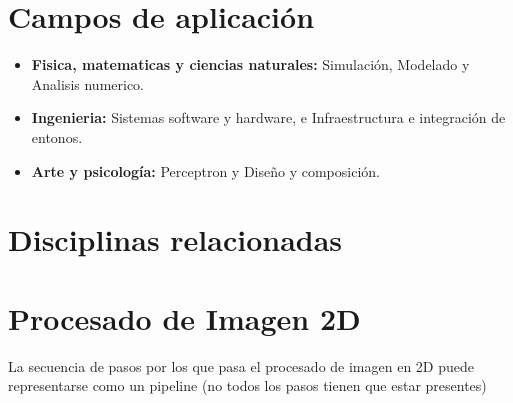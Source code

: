   \section{Campos de aplicación}
\begin{itemize}
  \item \textbf{Fisica, matematicas y ciencias naturales:} Simulación, Modelado y Analisis numerico.
  \item \textbf{Ingenieria:} Sistemas software y hardware, e Infraestructura e integración de entonos.
  \item \textbf{Arte y psicología:} Perceptron y Diseño y composición.
\end{itemize}

\section{Disciplinas relacionadas}
\begin{figure}[H]
	{\def\svgwidth{.8\textwidth}
		}
\end{figure}

  \section{Procesado de Imagen 2D}
  La secuencia de pasos por los que pasa el procesado de imagen en 2D puede representarse como un pipeline (no todos los pasos tienen que estar presentes)
\begin{figure}[H]
	{\def\svgwidth{.8\textwidth}
		}
\end{figure}

